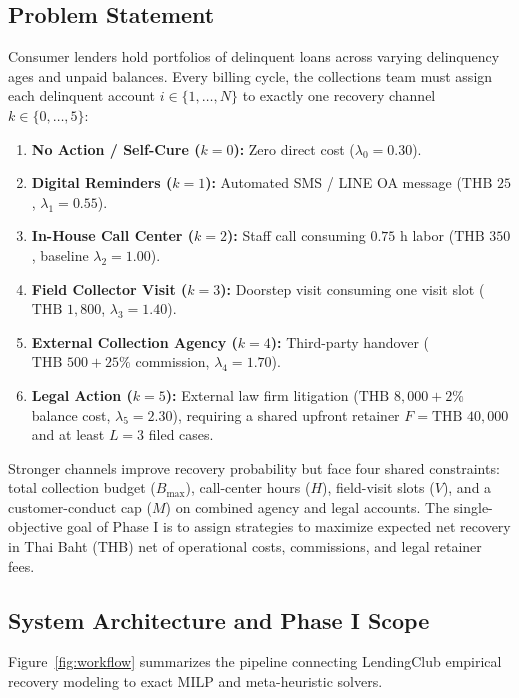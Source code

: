\documentclass[10pt,a4paper]{article}
\begin{document}
\subsection{Problem Statement}
Consumer lenders hold portfolios of delinquent loans across varying delinquency ages and unpaid balances. Every billing cycle, the collections team must assign each delinquent account $i \in \{1,\dots,N\}$ to exactly one recovery channel $k \in \{0,\dots,5\}$:
\begin{enumerate}[label=(\roman*)]
    \item \textbf{No Action / Self-Cure ($k=0$):} Zero direct cost ($\lambda_0 = 0.30$).
    \item \textbf{Digital Reminders ($k=1$):} Automated SMS / LINE OA message ($\text{THB~}25$, $\lambda_1 = 0.55$).
    \item \textbf{In-House Call Center ($k=2$):} Staff call consuming $0.75\text{ h}$ labor ($\text{THB~}350$, baseline $\lambda_2 = 1.00$).
    \item \textbf{Field Collector Visit ($k=3$):} Doorstep visit consuming one visit slot ($\text{THB~}1{,}800$, $\lambda_3 = 1.40$).
    \item \textbf{External Collection Agency ($k=4$):} Third-party handover ($\text{THB~}500 + 25\%$ commission, $\lambda_4 = 1.70$).
    \item \textbf{Legal Action ($k=5$):} External law firm litigation ($\text{THB~}8{,}000 + 2\%$ balance cost, $\lambda_5 = 2.30$), requiring a shared upfront retainer $F = \text{THB~}40{,}000$ and at least $L = 3$ filed cases.
\end{enumerate}
Stronger channels improve recovery probability but face four shared constraints: total collection budget ($B_{\max}$), call-center hours ($H$), field-visit slots ($V$), and a customer-conduct cap ($M$) on combined agency and legal accounts. The single-objective goal of Phase I is to assign strategies to maximize expected net recovery in Thai Baht (THB) net of operational costs, commissions, and legal retainer fees.

\subsection{System Architecture and Phase I Scope}
Figure~\ref{fig:workflow} summarizes the pipeline connecting LendingClub empirical recovery modeling to exact MILP and meta-heuristic solvers.
\end{document}
